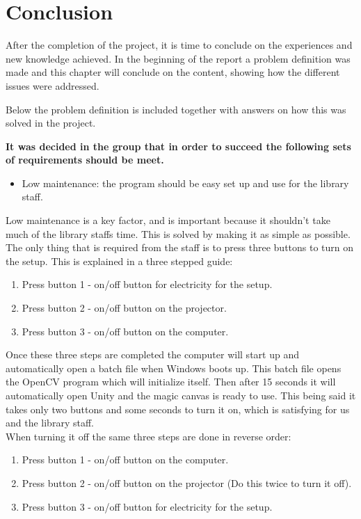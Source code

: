 \chapter{Conclusion}
After the completion of the project, it is time to conclude on the experiences and new knowledge achieved. In the beginning of the report a problem definition was made and this chapter will conclude on the content, showing how the different issues were addressed.

Below the problem definition is included together with answers on how this was solved in the project.

\textbf{It was decided in the group that in order to succeed the following sets of requirements should be meet.} 

\begin{itemize}
\item Low maintenance: the program should be easy set up and use for the library staff.
\end{itemize}

Low maintenance is a key factor, and is important because it shouldn't take much of the library staffs time. This is solved by making it as simple as possible. The only thing that is required from the staff is to press three buttons to turn on the setup. This is explained in a three stepped guide:
\begin{enumerate}
\item Press button 1 - on/off button for electricity for the setup.
\item Press button 2 - on/off button on the projector.
\item Press button 3 - on/off button on the computer.
\end{enumerate}

Once these three steps are completed the computer will start up and automatically open a batch file when Windows boots up. This batch file opens the OpenCV program which will initialize itself. Then after 15 seconds it will automatically open Unity and the magic canvas is ready to use. This being said it takes only two buttons and some seconds to turn it on, which is satisfying for us and the library staff.\\
When turning it off the same three steps are done in reverse order:
 
\begin{enumerate}
\item Press button 1 - on/off button on the computer.
\item Press button 2 - on/off button on the projector (Do this twice to turn it off).
\item Press button 3 - on/off button for electricity for the setup.
\end{enumerate}

